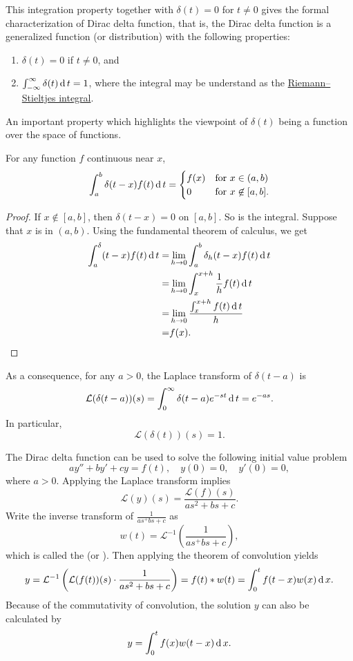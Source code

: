 This integration property together with $\delta(t)=0$ for $t\neq 0$ gives the formal characterization of Dirac delta function, that is, the Dirac delta function is a generalized function (or distribution) with the following properties:
\begin{enumerate}
  \item $\delta(t)=0$ if $t\neq 0$, and
  \item $\int_{-\infty}^\infty \delta(t)\operatorname{d} t=1$, where the integral may be understand as the \href{https://en.wikipedia.org/wiki/Riemann%E2%80%93Stieltjes_integral}{Riemann–Stieltjes integral}.
\end{enumerate}

An important property which highlights the viewpoint of $\delta(t)$ being a function over the space of functions.

\begin{theorem}
  For any function $f$ continuous near $x$, 
  \[
    \int_a^b\delta(t-x)f(t)\operatorname{d} t=\begin{cases}
    f(x) & \text{for } x\in (a, b)\\
    0 & \text{for } x\not\in [a, b].
  \end{cases}
  \]
\end{theorem}
\begin{proof}
  If $x\not\in [a, b]$, then $\delta(t-x)=0$ on $[a, b]$. So is the integral. Suppose that $x$ is in $(a, b)$.
  Using the fundamental theorem of calculus, we get
  \[
  \begin{aligned}
    \int_a^\delta(t-x)f(t)\operatorname{d} t=&\lim\limits_{h\to 0}\int_a^b\delta_h(t-x)f(t)\operatorname{d} t\\
    =&\lim\limits_{h\to 0}\int_{x}^{x+h}\frac{1}{h}f(t)\operatorname{d} t\\
    =&\lim\limits_{h\to 0}\frac{\int_{x}^{x+h}f(t)\operatorname{d} t}{h}\\
    =&f(x).
  \end{aligned}  
  \]
\end{proof}

As a consequence, for any $a>0$, the Laplace transform of $\delta(t-a)$ is
\[\mathcal{L}(\delta(t-a))(s)=\int_0^\infty\delta(t-a)e^{-st}\operatorname{d} t=e^{-as}.\]
In particular,
\[\mathcal{L}(\delta(t))(s)=1.\]

The Dirac delta function can be used to solve the following initial value problem
\[ay''+by'+cy=f(t), \quad y(0)=0, \quad y'(0)=0,\]
where $a>0$.
Applying the Laplace transform implies
\[\mathcal{L}(y)(s)=\frac{\mathcal{L}(f)(s)}{as^2+bs+c}.\]
Write the inverse transform of $\frac{1}{as^+bs+c}$ as
\[w(t)=\mathcal{L}^{-1}\left(\frac{1}{as^+bs+c}\right),\]
which is called the  (or ).
Then applying the theorem of convolution yields
\[y=\mathcal{L}^{-1}\left(\mathcal{L}(f(t))(s)\cdot \frac{1}{as^2+bs+c}\right)=f(t)*w(t)=\int_{0}^tf(t-x)w(x)\operatorname{d} x.\]
Because of the commutativity of convolution, the solution $y$ can also be calculated by
\[y=\int_0^tf(x)w(t-x)\operatorname{d} x.\]

